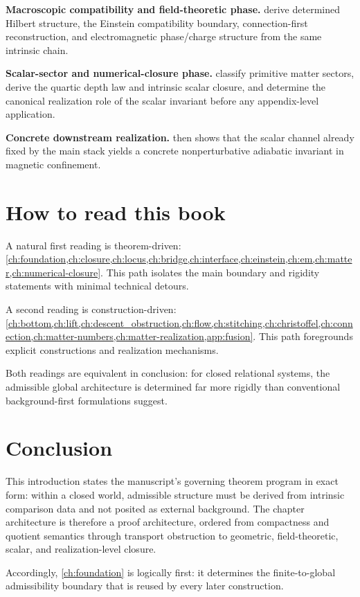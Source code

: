 \textbf{Macroscopic compatibility and field-theoretic phase.}
 derive determined Hilbert
structure, the Einstein compatibility boundary, connection-first
reconstruction, and electromagnetic phase/charge structure from the same
intrinsic chain.

\textbf{Scalar-sector and numerical-closure phase.}
classify primitive matter sectors, derive the quartic depth law and
intrinsic scalar closure, and determine the canonical realization role of
the scalar invariant before any appendix-level application.

\textbf{Concrete downstream realization.}
 then shows that the scalar channel already fixed by the
main stack yields a concrete nonperturbative adiabatic invariant in
magnetic confinement.

\section{How to read this book}
A natural first reading is theorem-driven:
\cref{ch:foundation,ch:closure,ch:locus,ch:bridge,ch:interface,ch:einstein,ch:em,ch:matter,ch:numerical-closure}.
This path isolates the main boundary and rigidity statements with minimal
technical detours.

A second reading is construction-driven:
\cref{ch:bottom,ch:lift,ch:descent_obstruction,ch:flow,ch:stitching,ch:christoffel,ch:connection,ch:matter-numbers,ch:matter-realization,app:fusion}.
This path foregrounds explicit constructions and realization mechanisms.

Both readings are equivalent in conclusion:
for closed relational systems, the admissible global architecture is
determined far more rigidly than conventional background-first
formulations suggest.

\section{Conclusion}
\label{sec:introduction-conclusion}
This introduction states the manuscript's governing theorem program in
exact form: within a closed world, admissible structure must be derived
from intrinsic comparison data and not posited as external background.
The chapter architecture is therefore a proof architecture, ordered from
compactness and quotient semantics through transport obstruction to
geometric, field-theoretic, scalar, and realization-level closure.

Accordingly, \cref{ch:foundation} is logically first: it determines the
finite-to-global admissibility boundary that is reused by every later
construction.